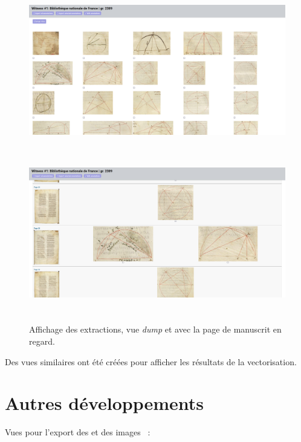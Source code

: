           \begin{figure}[H]
          \begin{center}
          \includegraphics[height=7cm]{figues/vue_dump.png}
          \includegraphics[height=7cm]{figues/vue_contexte.png}
          \end{center}
          \caption{Affichage des extractions, vue \emph{dump} et avec la page de manuscrit en regard.}
          \label{fig:old_interface_1} \end{figure}

Des vues similaires ont été créées pour afficher les résultats de la vectorisation. 

\section{Autres développements }

Vues pour l'export des \svgs et des images \jpeg~: 

